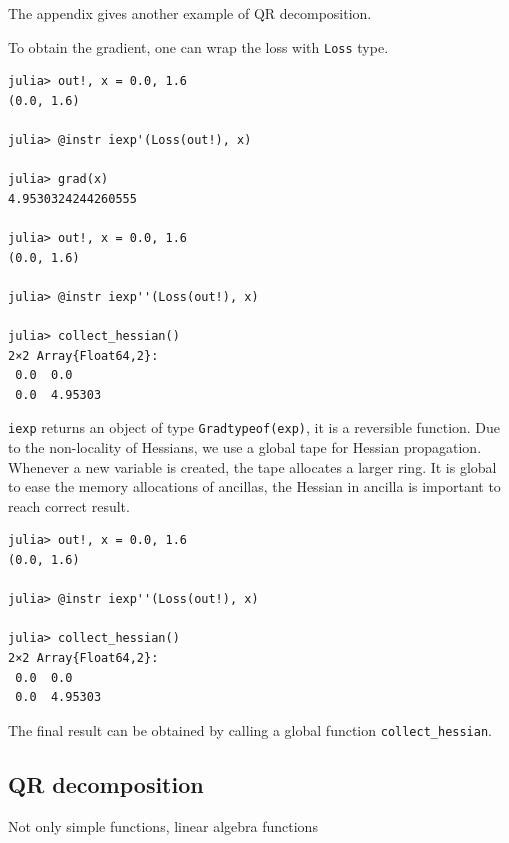 \documentclass[aps,twocolumn,longbibliography,english,superscriptaddress,prr]{revtex4-1}
\newcommand{\<}{\langle}
\renewcommand{\>}{\rangle}
\theoremstyle{definition}\newtheorem{definition}{\textit{Definition}}
\begin{document}
The appendix gives another example of QR decomposition.

To obtain the gradient, one can wrap the loss with \texttt{Loss} type.

\begin{minipage}{.44\textwidth}
\begin{lstlisting}
julia> out!, x = 0.0, 1.6
(0.0, 1.6)

julia> @instr iexp'(Loss(out!), x)

julia> grad(x)
4.9530324244260555

julia> out!, x = 0.0, 1.6
(0.0, 1.6)

julia> @instr iexp''(Loss(out!), x)

julia> collect_hessian()
2×2 Array{Float64,2}:
 0.0  0.0
 0.0  4.95303
\end{lstlisting}
\end{minipage}

\texttt{iexp\textquotesingle} returns an object of type \texttt{Grad{typeof(exp)}}, it is a reversible function.
Due to the non-locality of Hessians, we use a global tape for Hessian propagation. Whenever a new variable is created, the tape allocates a larger ring.
It is global to ease the memory allocations of ancillas, the Hessian in ancilla is important to reach correct result.

\begin{minipage}{.44\textwidth}
\begin{lstlisting}
julia> out!, x = 0.0, 1.6
(0.0, 1.6)

julia> @instr iexp''(Loss(out!), x)

julia> collect_hessian()
2×2 Array{Float64,2}:
 0.0  0.0
 0.0  4.95303
\end{lstlisting}
\end{minipage}

The final result can be obtained by calling a global function \texttt{collect\_hessian}.

\subsection{QR decomposition}

Not only simple functions, linear algebra functions 
\end{document}
